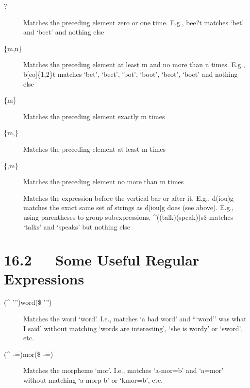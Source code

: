 \documentclass[letterpaper,10pt,english]{sphinxmanual}
\begin{document}
\begin{description}
\item[{?}] \leavevmode
Matches the preceding element zero or one time.  E.g., bee?t matches `bet'
and `beet' and nothing else

\item[{\{m,n\}}] \leavevmode
Matches the preceding element at least m and no more than n times.  E.g.,
b{[}eo{]}\{1,2\}t matches `bet', `beet', `bot', `boot', `beot', `boet' and nothing
else

\item[{\{m\}}] \leavevmode
Matches the preceding element exactly m times

\item[{\{m,\}}] \leavevmode
Matches the preceding element at least m times

\item[{\{,m\}}] \leavevmode
Matches the preceding element no more than m times

\item[{\textbar{}}] \leavevmode
Matches the expression before the vertical bar or after it.  E.g., d(i\textbar{}o\textbar{}u)g
matches the exact same set of strings as d{[}iou{]}g does (see above).  E.g.,
using parentheses to group subexpressions, \textasciicircum{}((talk)\textbar{}(speak))s\$ matches
`talks' and `speaks' but nothing else

\end{description}


\section{16.2   Some Useful Regular Expressions}
\label{documentation:some-useful-regular-expressions}\begin{description}
\item[{(\textasciicircum{}\textbar{} \textbar{}'\textbar{}'')word(\$\textbar{} \textbar{}'\textbar{}'')}] \leavevmode
Matches the word `word'.  I.e., matches `a bad word' and ```word'' was what
I said' without matching `words are interesting', `she is wordy' or
`sword', etc.

\item[{(\textasciicircum{}\textbar{} \textbar{}-\textbar{}=)mor(\$\textbar{} \textbar{}-\textbar{}=)}] \leavevmode
Matches the morpheme `mor'.  I.e., matches `a-mor=b' and `a=mor' without
matching `a-morp-b' or `kmor=b', etc.

\end{description}
\end{document}
